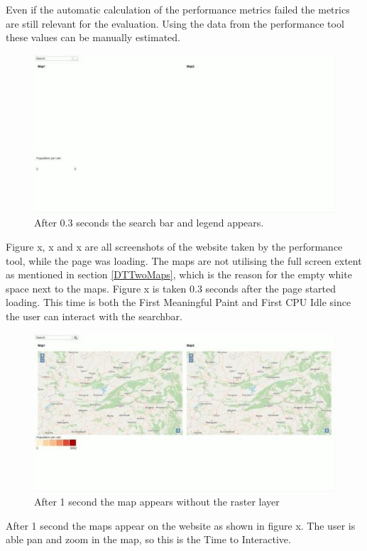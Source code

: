 Even if the automatic calculation of the performance metrics failed the metrics are still relevant for the evaluation. Using the data from the performance tool these values can be manually estimated. 

\begin{figure} [H]
	\centering
	\includegraphics[width=.8\textwidth]{Pictures/ScreenshotLoading1}
	\caption{After 0.3 seconds the search bar and legend appears.}
	\label{ScreenshotLoading1}
\end{figure}

Figure x, x and x are all screenshots of the website taken by the performance tool, while the page was loading. The maps are not utilising the full screen extent as mentioned in section \ref{DTTwoMaps}, which is the reason for the empty white space next to the maps. Figure x is taken 0.3 seconds after the page started loading. This time is both the First Meaningful Paint and First CPU Idle since the user can interact with the searchbar.

\begin{figure} [H]
	\centering
	\includegraphics[width=.8\textwidth]{Pictures/ScreenshotLoading2}
	\caption{After 1 second the map appears without the raster layer}
	\label{ScreenshotLoading2}
\end{figure}

After 1 second the maps appear on the website as shown in figure x. The user is able pan and zoom in the map, so this is the Time to Interactive. 

